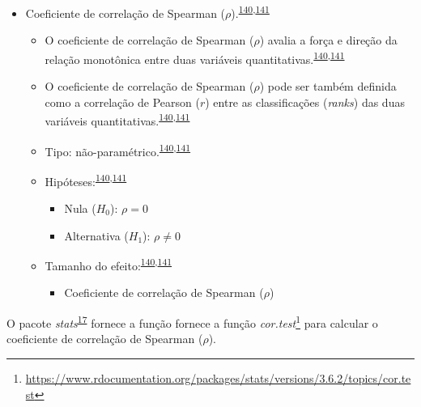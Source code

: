 \documentclass[
]{book}
\providecommand{\tightlist}{%
  \setlength{\itemsep}{0pt}\setlength{\parskip}{0pt}}
\renewcommand{\href}[2]{#2\footnote{\url{#1}}}
\newenvironment{infobox}[1]
  {
  \begin{itemize}
  \renewcommand{\labelitemi}{
    \raisebox{-.7\height}[0pt][0pt]{
      {\setkeys{Gin}{width=3em,keepaspectratio}
        \texttt{[image: \#1]}}
    }
  }
  \setlength{\fboxsep}{1em}
  \begin{blackbox}
  \item
  }
  {
  \end{blackbox}
  \end{itemize}
  }
\begin{document}
\begin{itemize}
\item
  Coeficiente de correlação de Spearman (\(\rho\)).\textsuperscript{\protect\hyperlink{ref-khamis2008}{140},\protect\hyperlink{ref-allison2022}{141}}

  \begin{itemize}
  \item
    O coeficiente de correlação de Spearman (\(\rho\)) avalia a força e direção da relação monotônica entre duas variáveis quantitativas.\textsuperscript{\protect\hyperlink{ref-khamis2008}{140},\protect\hyperlink{ref-allison2022}{141}}
  \item
    O coeficiente de correlação de Spearman (\(\rho\)) pode ser também definida como a correlação de Pearson (\(r\)) entre as classificações (\emph{ranks}) das duas variáveis quantitativas.\textsuperscript{\protect\hyperlink{ref-khamis2008}{140},\protect\hyperlink{ref-allison2022}{141}}
  \item
    Tipo: não-paramétrico.\textsuperscript{\protect\hyperlink{ref-khamis2008}{140},\protect\hyperlink{ref-allison2022}{141}}
  \item
    Hipóteses:\textsuperscript{\protect\hyperlink{ref-khamis2008}{140},\protect\hyperlink{ref-allison2022}{141}}

    \begin{itemize}
    \item
      Nula (\(H_{0}\)): \(\rho=0\)
    \item
      Alternativa (\(H_{1}\)): \(\rho≠0\)
    \end{itemize}
  \item
    Tamanho do efeito:\textsuperscript{\protect\hyperlink{ref-khamis2008}{140},\protect\hyperlink{ref-allison2022}{141}}

    \begin{itemize}
    \tightlist
    \item
      Coeficiente de correlação de Spearman (\(\rho\))
    \end{itemize}
  \end{itemize}
\end{itemize}

\begin{infobox}{images/Rlogo}
O pacote \emph{stats}\textsuperscript{\protect\hyperlink{ref-stats-2}{17}} fornece a função fornece a função \href{https://www.rdocumentation.org/packages/stats/versions/3.6.2/topics/cor.test}{\emph{cor.test}} para calcular o coeficiente de correlação de Spearman (\(\rho\)).

\end{infobox}
\end{document}
